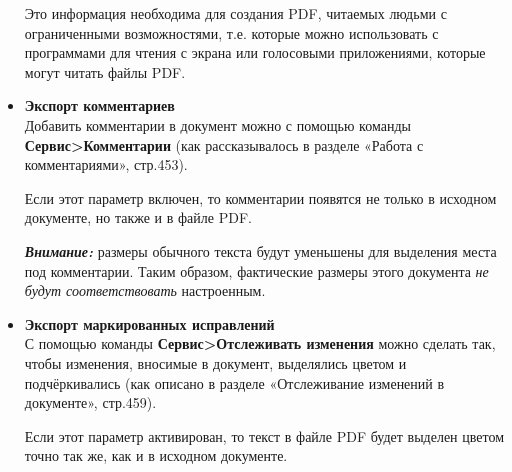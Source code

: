 ﻿\documentclass[a4paper,10pt]{article}
\begin{document}
\begin{itemize}
Это информация необходима для создания PDF, читаемых людьми с ограниченными возможностями, т.е. которые можно использовать с программами для чтения с экрана или голосовыми приложениями, которые могут читать файлы PDF.
\item \textbf{Экспорт комментариев}\\
Добавить комментарии в документ можно с помощью команды \textbf{Сервис>Комментарии} (как рассказывалось в разделе «Работа с комментариями», стр.453).

Если этот параметр включен, то комментарии появятся не только в исходном документе, но также и в файле PDF.
\pagebreak
\begin{mdframed}[backgroundcolor=blue!10]
\textbf{\textit{Внимание:}} размеры обычного текста будут уменьшены для выделения места под комментарии. Таким образом, фактические размеры этого документа \textit{не будут соответствовать} настроенным.
\end{mdframed}
\item \textbf{Экспорт маркированных исправлений}\\
С помощью команды \textbf{Сервис>Отслеживать изменения} можно сделать так, чтобы изменения, вносимые в документ, выделялись цветом и подчёркивались (как описано в разделе «Отслеживание изменений в документе», стр.459).

Если этот параметр активирован, то текст в файле PDF будет выделен цветом точно так же, как и в исходном документе.
\end{itemize}
\end{document}
